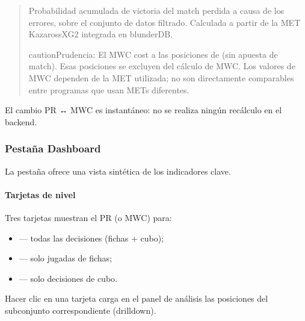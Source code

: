 \documentclass[letterpaper,10pt,spanish]{sphinxmanual}
\begin{document}
\sphinxAtStartPar
{}
\begin{quote}

\sphinxAtStartPar
Probabilidad acumulada de victoria del match perdida a causa de los errores, sobre el conjunto de datos filtrado. Calculada a partir de la MET Kazaross\sphinxhyphen{}XG2 integrada en blunderDB.

\begin{sphinxadmonition}{caution}{Prudencia:}
\sphinxAtStartPar
El MWC cost  a las posiciones de  (sin apuesta de match). Esas posiciones se excluyen del cálculo de MWC. Los valores de MWC dependen de la MET utilizada; no son directamente comparables entre programas que usan METs diferentes.
\end{sphinxadmonition}
\end{quote}

\sphinxAtStartPar
El cambio PR ↔ MWC es instantáneo: no se realiza ningún recálculo en el backend.


\subsubsection{Pestaña Dashboard}
\label{\detokenize{manuel:onglet-dashboard}}
\sphinxAtStartPar
La pestaña  ofrece una vista sintética de los indicadores clave.


\paragraph{Tarjetas de nivel}
\label{\detokenize{manuel:cartes-de-niveau}}
\sphinxAtStartPar
Tres tarjetas muestran el PR (o MWC) para:
\begin{itemize}
\item {} 
\sphinxAtStartPar
{} — todas las decisiones (fichas + cubo);

\item {} 
\sphinxAtStartPar
{} — solo jugadas de fichas;

\item {} 
\sphinxAtStartPar
{} — solo decisiones de cubo.

\end{itemize}

\sphinxAtStartPar
Hacer clic en una tarjeta carga en el panel de análisis las posiciones del subconjunto correspondiente (drill\sphinxhyphen{}down).
\end{document}
